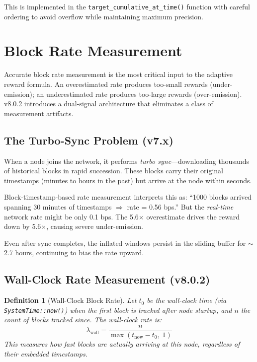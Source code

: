 \documentclass[11pt,a4paper]{article}
\newtheorem{definition}[theorem]{Definition}
\begin{document}
This is implemented in the \texttt{target\_cumulative\_at\_time()} function with careful ordering to avoid overflow while maintaining maximum precision.

\section{Block Rate Measurement}

Accurate block rate measurement is the most critical input to the adaptive reward formula. An overestimated rate produces too-small rewards (under-emission); an underestimated rate produces too-large rewards (over-emission). v8.0.2 introduces a dual-signal architecture that eliminates a class of measurement artifacts.

\subsection{The Turbo-Sync Problem (v7.x)}

\begin{tcolorbox}[colback=red!5,colframe=qugred,title=\textbf{Bug: 96\% Under-Emission (v8.0.1)}]
When a node joins the network, it performs \emph{turbo sync}---downloading thousands of historical blocks in rapid succession. These blocks carry their original timestamps (minutes to hours in the past) but arrive at the node within seconds.

Block-timestamp-based rate measurement interprets this as: ``1000 blocks arrived spanning 30 minutes of timestamps $\Rightarrow$ rate = 0.56 bps.'' But the \emph{real-time} network rate might be only 0.1 bps. The 5.6$\times$ overestimate drives the reward down by 5.6$\times$, causing severe under-emission.

Even after sync completes, the inflated windows persist in the sliding buffer for $\sim$2.7 hours, continuing to bias the rate upward.
\end{tcolorbox}

\subsection{Wall-Clock Rate Measurement (v8.0.2)}

\begin{definition}[Wall-Clock Block Rate]
Let $t_0$ be the wall-clock time (via \texttt{SystemTime::now()}) when the first block is tracked after node startup, and $n$ the count of blocks tracked since. The wall-clock rate is:
\begin{equation}
    \lambda_{\text{wall}} = \frac{n}{\max(t_{\text{now}} - t_0, \; 1)}
\end{equation}
This measures how fast blocks are \emph{actually arriving at this node}, regardless of their embedded timestamps.
\end{definition}
\end{document}
